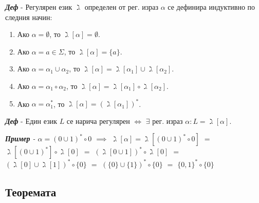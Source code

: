 \documentclass[fleqn,12pt]{article}
\begin{document}
\begin{flushleft}
\textit{\textbf{Деф}} - Регулярен език $\gimel$ определен от рег. израз $\alpha$ се дефинира индуктивно по следния начин:
\begin{enumerate}
    \item Ако $\alpha = \emptyset$, то $\gimel[\alpha] = \emptyset$.
    \item Ако $\alpha = a \in \Sigma$, то $\gimel[\alpha] = \{a\}$.
    \item Ако $\alpha = \alpha_1 \cup \alpha_2$, то $\gimel[\alpha] = \gimel[\alpha_1] \cup \gimel[\alpha_2]$.
    \item Ако $\alpha = \alpha_1 \circ \alpha_2$, то $\gimel[\alpha] = \gimel[\alpha_1] \circ \gimel [\alpha_2]$.
    \item Ако $\alpha = \alpha_1^*$, то $\gimel[\alpha] = (\gimel[\alpha_1])^*$.
\end{enumerate}

\textit{\textbf{Деф}} - Един език $L$ се нарича регулярен $\iff$ $\exists$ рег. израз $\alpha: L = \gimel[\alpha]$.

\textit{\textbf{Пример} - $\alpha = (0 \cup 1)^* \circ 0$ $\implies$ $\gimel[\alpha] = \gimel[(0 \cup 1)^* \circ 0]$ $=$ $\gimel[(0 \cup 1)^*] \circ \gimel[0]$ $=$ $(\gimel[0 \cup 1])^* \circ \gimel[0]$ $=$ $(\gimel[0] \cup \gimel[1])^* \circ \{0\}$ $=$ $(\{0\} \cup \{1\})^* \circ \{0\}$ $=$ $\{0, 1\}^* \circ \{0\}$ }

\subsection{Теоремата}


\end{flushleft}
\end{document}
